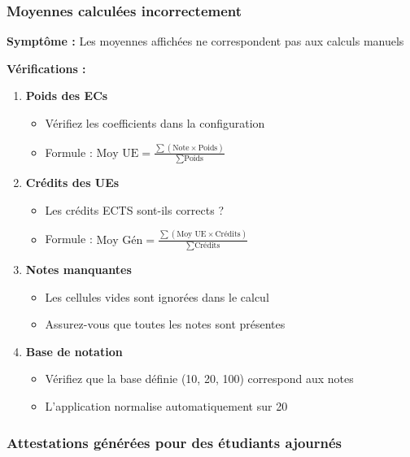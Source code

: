 \subsubsection{Moyennes calculées incorrectement}

\textbf{Symptôme :} Les moyennes affichées ne correspondent pas aux calculs manuels

\textbf{Vérifications :}
\begin{enumerate}[leftmargin=*]
    \item \textbf{Poids des ECs}
    \begin{itemize}
        \item Vérifiez les coefficients dans la configuration
        \item Formule : $\text{Moy UE} = \frac{\sum(\text{Note} \times \text{Poids})}{\sum \text{Poids}}$
    \end{itemize}

    \item \textbf{Crédits des UEs}
    \begin{itemize}
        \item Les crédits ECTS sont-ils corrects ?
        \item Formule : $\text{Moy Gén} = \frac{\sum(\text{Moy UE} \times \text{Crédits})}{\sum \text{Crédits}}$
    \end{itemize}

    \item \textbf{Notes manquantes}
    \begin{itemize}
        \item Les cellules vides sont ignorées dans le calcul
        \item Assurez-vous que toutes les notes sont présentes
    \end{itemize}

    \item \textbf{Base de notation}
    \begin{itemize}
        \item Vérifiez que la base définie (10, 20, 100) correspond aux notes
        \item L'application normalise automatiquement sur 20
    \end{itemize}
\end{enumerate}

\subsubsection{Attestations générées pour des étudiants ajournés}

